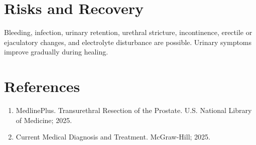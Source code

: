 \section*{Risks and Recovery}
Bleeding, infection, urinary retention, urethral stricture, incontinence, erectile or ejaculatory changes, and electrolyte disturbance are possible. Urinary symptoms improve gradually during healing.
\section*{References}
\begin{enumerate}\item MedlinePlus. Transurethral Resection of the Prostate. U.S. National Library of Medicine; 2025.\item Current Medical Diagnosis and Treatment. McGraw-Hill; 2025.\end{enumerate}
\clearpage
